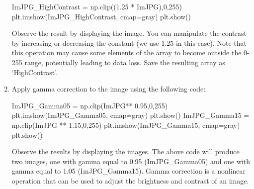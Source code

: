 \documentclass[11pt]{article}
\newenvironment{Shaded}{}{}
\newcommand{\DecValTok}[1]{\textcolor[rgb]{0.25,0.63,0.44}{{#1}}}
\newcommand{\FloatTok}[1]{\textcolor[rgb]{0.25,0.63,0.44}{{#1}}}
\newcommand{\StringTok}[1]{\textcolor[rgb]{0.25,0.44,0.63}{{#1}}}
\newcommand{\NormalTok}[1]{{#1}}
\newcommand{\OperatorTok}[1]{\textcolor[rgb]{0.40,0.40,0.40}{{#1}}}
\begin{document}
\begin{enumerate}
\begin{Shaded}
\begin{tcolorbox}[breakable, size=fbox, boxrule=1pt, pad at break*=1mm,colback=cellbackground, colframe=cellborder]
  \begin{Highlighting}[]
\NormalTok{ImJPG\_HighContrast }\OperatorTok{=}\NormalTok{ np.clip((}\FloatTok{1.25} \OperatorTok{*}\NormalTok{ ImJPG),}\DecValTok{0}\NormalTok{,}\DecValTok{255}\NormalTok{)}
\NormalTok{plt.imshow(ImJPG\_HighContrast, cmap}\OperatorTok{=}\StringTok{\textquotesingle{}gray\textquotesingle{}}\NormalTok{)}
\NormalTok{plt.show()}
\end{Highlighting}
\end{tcolorbox}
\end{Shaded}

  Observe the result by displaying the image. You can manipulate the
  contrast by increasing or decreasing the constant (we use 1.25 in this
  case). Note that this operation may cause some elements of the array
  to become outside the 0-255 range, potentially leading to data loss.
  Save the resulting array as `HighContrast'.
\item
  Apply gamma correction to the image using the following code:

\begin{Shaded}
\begin{tcolorbox}[breakable, size=fbox, boxrule=1pt, pad at break*=1mm,colback=cellbackground, colframe=cellborder]
  \begin{Highlighting}[]
\NormalTok{ImJPG\_Gamma05 }\OperatorTok{=}\NormalTok{ np.clip(ImJPG}\OperatorTok{**} \FloatTok{0.95}\NormalTok{,}\DecValTok{0}\NormalTok{,}\DecValTok{255}\NormalTok{)}
\NormalTok{plt.imshow(ImJPG\_Gamma05, cmap}\OperatorTok{=}\StringTok{\textquotesingle{}gray\textquotesingle{}}\NormalTok{)}
\NormalTok{plt.show()}
\NormalTok{ImJPG\_Gamma15 }\OperatorTok{=}\NormalTok{ np.clip(ImJPG }\OperatorTok{**} \FloatTok{1.15}\NormalTok{,}\DecValTok{0}\NormalTok{,}\DecValTok{255}\NormalTok{)}
\NormalTok{plt.imshow(ImJPG\_Gamma15, cmap}\OperatorTok{=}\StringTok{\textquotesingle{}gray\textquotesingle{}}\NormalTok{)}
\NormalTok{plt.show()}
\end{Highlighting}
\end{tcolorbox}
\end{Shaded}

  Observe the results by displaying the images. The above code will
  produce two images, one with gamma equal to 0.95 (ImJPG\_Gamma05) and
  one with gamma equal to 1.05 (ImJPG\_Gamma15). Gamma correction is a
  nonlinear operation that can be used to adjust the brightness and
  contrast of an image.
\end{enumerate}    
\end{document}
